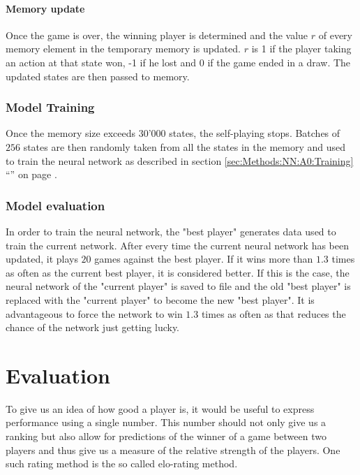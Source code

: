 \documentclass[12pt]{article}
\newcommand{\sectionref}[1]{section \ref{#1} ``\nameref{#1}'' on page \pageref{#1}}
\newcommand{\batchSize}{256}
\begin{document}
\paragraph{Memory update}\label{sec:memoryUpdate}
Once the game is over, the winning player is determined and the value \(r\) of every memory element in the temporary memory is updated. \(r\) is 1 if the player taking an action at that state won, -1 if he lost and 0 if the game ended in a draw. The updated states are then passed to memory.

\subsubsection{Model Training}
Once the memory size exceeds 30'000 states, the self-playing stops. Batches of \(\batchSize\) states are then randomly taken from all the states in the memory and used to train the neural network as described in \sectionref{sec:Methods:NN:A0:Training}.

\subsubsection{Model evaluation}\label{sec:modelEvaluation}
In order to train the neural network, the "best player" generates data used to train the current network.
After every time the current neural network has been updated, it plays \(20\) games against the best player. If it wins more than \(1.3\) times as often as the current best player, it is considered better. If this is the case, the neural network of the "current player" is saved to file and the old "best player" is replaced with the "current player" to become the new "best player". It is advantageous to force the network to win \(1.3\) times as often as that reduces the chance of the network just getting lucky. 

\newpage
\section{Evaluation}\label{sec:evaluation}
To give us an idea of how good a player is, it would be useful to express performance using a single number. This number should not only give us a ranking but also allow for predictions of the winner of a game between two players and thus give us a measure of the relative strength of the players. One such rating method is the so called elo-rating method. \cite{elo1978rating}
\end{document}
